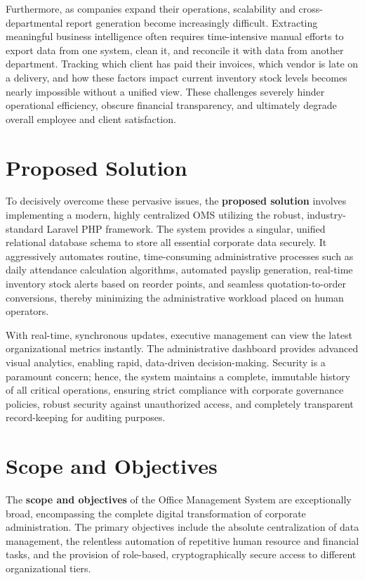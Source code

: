 ﻿\documentclass[12pt,a4paper]{report}
\begin{document}
Furthermore, as companies expand their operations, scalability and cross-departmental report generation become increasingly difficult. Extracting meaningful business intelligence often requires time-intensive manual efforts to export data from one system, clean it, and reconcile it with data from another department. Tracking which client has paid their invoices, which vendor is late on a delivery, and how these factors impact current inventory stock levels becomes nearly impossible without a unified view. These challenges severely hinder operational efficiency, obscure financial transparency, and ultimately degrade overall employee and client satisfaction.

\section*{Proposed Solution}
To decisively overcome these pervasive issues, the \textbf{proposed solution} involves implementing a modern, highly centralized OMS utilizing the robust, industry-standard Laravel PHP framework. The system provides a singular, unified relational database schema to store all essential corporate data securely. It aggressively automates routine, time-consuming administrative processes such as daily attendance calculation algorithms, automated payslip generation, real-time inventory stock alerts based on reorder points, and seamless quotation-to-order conversions, thereby minimizing the administrative workload placed on human operators. 

With real-time, synchronous updates, executive management can view the latest organizational metrics instantly. The administrative dashboard provides advanced visual analytics, enabling rapid, data-driven decision-making. Security is a paramount concern; hence, the system maintains a complete, immutable history of all critical operations, ensuring strict compliance with corporate governance policies, robust security against unauthorized access, and completely transparent record-keeping for auditing purposes.

\section*{Scope and Objectives}
The \textbf{scope and objectives} of the Office Management System are exceptionally broad, encompassing the complete digital transformation of corporate administration. The primary objectives include the absolute centralization of data management, the relentless automation of repetitive human resource and financial tasks, and the provision of role-based, cryptographically secure access to different organizational tiers. 
\end{document}
